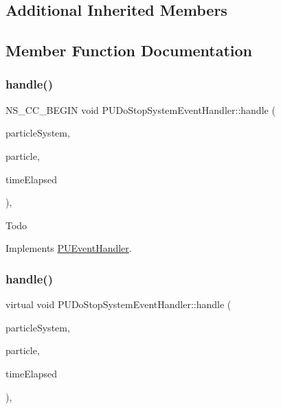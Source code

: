 \subsection*{Additional Inherited Members}


\subsection{Member Function Documentation}
\mbox{\label{classPUDoStopSystemEventHandler_aedf9765b3b2652fd3828f4be017a727c}} 
\subsubsection{\texorpdfstring{handle()}{handle()}\hspace{0.1cm}{\footnotesize\ttfamily [1/2]}}
{\footnotesize\ttfamily N\+S\+\_\+\+C\+C\+\_\+\+B\+E\+G\+IN void P\+U\+Do\+Stop\+System\+Event\+Handler\+::handle (\begin{DoxyParamCaption}\item[{\hyperlink{classPUParticleSystem3D}{P\+U\+Particle\+System3D} $\ast$}]{particle\+System,  }\item[{\hyperlink{structPUParticle3D}{P\+U\+Particle3D} $\ast$}]{particle,  }\item[{float}]{time\+Elapsed }\end{DoxyParamCaption})\hspace{0.3cm}{\ttfamily [override]}, {\ttfamily [virtual]}}

Todo 

Implements \hyperlink{classPUEventHandler_a760172609708c65548dcac364c9b3b9c}{P\+U\+Event\+Handler}.

\mbox{\label{classPUDoStopSystemEventHandler_ad80081500e5553c7a76c2f0b966b9f42}} 
\subsubsection{\texorpdfstring{handle()}{handle()}\hspace{0.1cm}{\footnotesize\ttfamily [2/2]}}
{\footnotesize\ttfamily virtual void P\+U\+Do\+Stop\+System\+Event\+Handler\+::handle (\begin{DoxyParamCaption}\item[{\hyperlink{classPUParticleSystem3D}{P\+U\+Particle\+System3D} $\ast$}]{particle\+System,  }\item[{\hyperlink{structPUParticle3D}{P\+U\+Particle3D} $\ast$}]{particle,  }\item[{float}]{time\+Elapsed }\end{DoxyParamCaption})\hspace{0.3cm}{\ttfamily [override]}, {\ttfamily [virtual]}}

